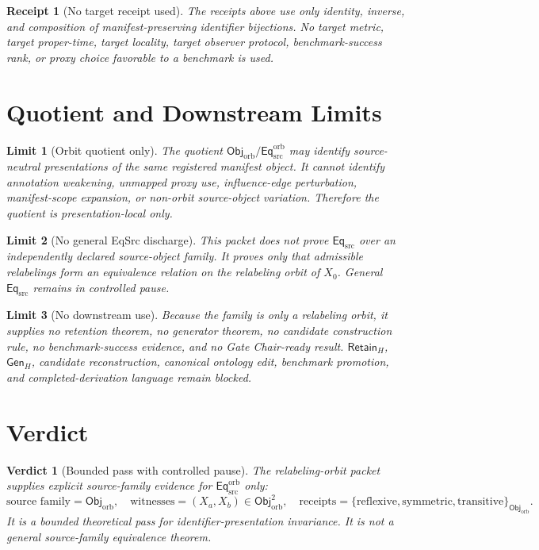 \documentclass[11pt]{article}
\newcommand{\ObjOrb}{\mathsf{Obj}_{\mathrm{orb}}}
\newcommand{\EqSrc}{\mathsf{Eq}_{\mathrm{src}}}
\newcommand{\EqOrb}{\mathsf{Eq}_{\mathrm{src}}^{\mathrm{orb}}}
\newcommand{\GenH}{\mathsf{Gen}_{H}}
\newcommand{\RetainH}{\mathsf{Retain}_{H}}
\newtheorem{receipt}{Receipt}
\newtheorem{limit}{Limit}
\newtheorem{verdict}{Verdict}
\begin{document}
\begin{receipt}[No target receipt used]
The receipts above use only identity, inverse, and composition of
manifest-preserving identifier bijections. No target metric, target
proper-time, target locality, target observer protocol, benchmark-success
rank, or proxy choice favorable to a benchmark is used.
\end{receipt}

\section{Quotient and Downstream Limits}

\begin{limit}[Orbit quotient only]
The quotient \(\ObjOrb/{\EqOrb}\) may identify source-neutral
presentations of the same registered manifest object. It cannot identify
annotation weakening, unmapped proxy use, influence-edge perturbation,
manifest-scope expansion, or non-orbit source-object variation. Therefore
the quotient is presentation-local only.
\end{limit}

\begin{limit}[No general EqSrc discharge]
This packet does not prove \(\EqSrc\) over an independently declared
source-object family. It proves only that admissible relabelings form an
equivalence relation on the relabeling orbit of \(X_{0}\). General
\(\EqSrc\) remains in controlled pause.
\end{limit}

\begin{limit}[No downstream use]
Because the family is only a relabeling orbit, it supplies no retention
theorem, no generator theorem, no candidate construction rule, no
benchmark-success evidence, and no Gate Chair-ready result. \(\RetainH\),
\(\GenH\), candidate reconstruction, canonical ontology edit, benchmark
promotion, and completed-derivation language remain blocked.
\end{limit}

\section{Verdict}

\begin{verdict}[Bounded pass with controlled pause]
The relabeling-orbit packet supplies explicit source-family evidence for
\(\EqOrb\) only:
\[
    \text{source family}=\ObjOrb,\quad
    \text{witnesses}=(X_{a},X_{b})\in\ObjOrb^{2},\quad
    \text{receipts}=\{\mathrm{reflexive},\mathrm{symmetric},
    \mathrm{transitive}\}_{\ObjOrb}.
\]
It is a bounded theoretical pass for identifier-presentation invariance.
It is not a general source-family equivalence theorem.
\end{verdict}
\end{document}
